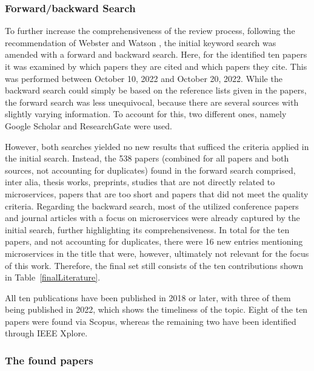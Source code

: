 \documentclass{bmcart}
\begin{document}




\subsubsection{Forward/backward Search}

To further increase the comprehensiveness of the review process, following the recommendation of Webster and Watson \cite{webster2002analyzing}, the initial keyword search was amended with a forward and backward search. Here, for the identified ten papers it was examined by which papers they are cited and which papers they cite. This was performed between October 10, 2022 and October 20, 2022. While the backward search could simply be based on the reference lists given in the papers, the forward search was less unequivocal, because there are several sources with slightly varying information. To account for this, two different ones, namely Google Scholar and ResearchGate were used. 

However, both searches yielded no new results that sufficed the criteria applied in the initial search. 
Instead, the 538 papers (combined for all papers and both sources, not accounting for duplicates) found in the forward search comprised, inter alia, thesis works, preprints, studies that are not directly related to microservices, papers that are too short and papers that did not meet the quality criteria. Regarding the backward search, most of the utilized conference papers and journal articles with a focus on microservices were already captured by the initial search, further highlighting its comprehensiveness. In total for the ten papers, and not accounting for duplicates, there were 16 new entries mentioning microservices in the title that were, however, ultimately not relevant for the focus of this work. Therefore, the final set still consists of the ten contributions shown in Table~\ref{finalLiterature}.

All ten publications have been published in 2018 or later, with three of them being published in 2022, which shows the timeliness of the topic. Eight of the ten papers were found via Scopus, whereas the remaining two have been identified through IEEE Xplore. 


\subsubsection{The found papers}
\end{document}
